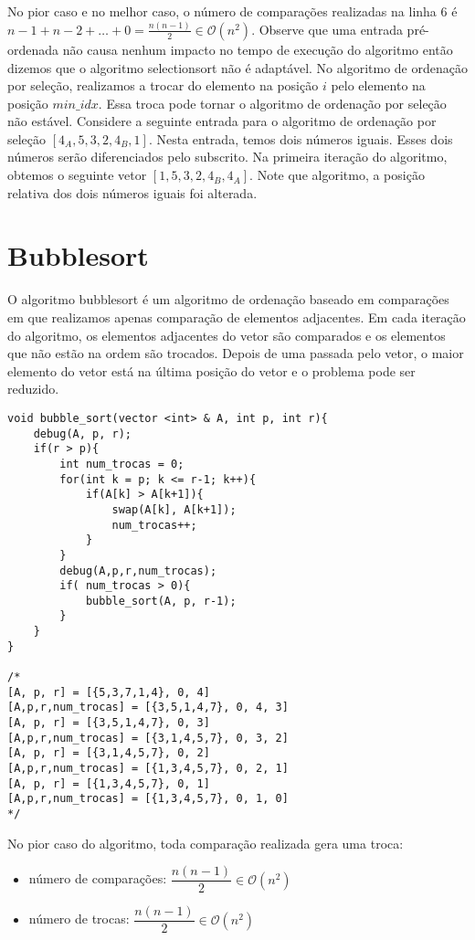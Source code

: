 No pior caso e no melhor caso, o número de comparações realizadas na linha 6 é $n-1 + n-2 + \ldots + 0 = \frac{n(n-1)}{2} \in \mathcal{O}(n^2)$. Observe que uma entrada pré-ordenada não causa nenhum impacto no tempo de execução do algoritmo então dizemos que o algoritmo selectionsort não é adaptável. No algoritmo de ordenação por seleção, realizamos a trocar do elemento na posição $i$ pelo elemento na posição $min\_idx$. Essa troca pode tornar o algoritmo de ordenação por seleção não estável. Considere a seguinte entrada para o algoritmo de ordenação por seleção $[4_A,5,3,2,4_B,1]$. Nesta entrada, temos dois números iguais. Esses dois números serão diferenciados pelo subscrito. Na primeira iteração do algoritmo, obtemos o seguinte vetor $[1,5,3,2,4_B,4_A]$. Note que algoritmo, a posição relativa dos dois números iguais foi alterada. 

\section{Bubblesort}

O algoritmo bubblesort é um algoritmo de ordenação baseado em comparações em que realizamos apenas comparação de elementos adjacentes. Em cada iteração do algoritmo, os elementos adjacentes do vetor são comparados e os elementos que não estão na ordem são trocados. Depois de uma passada pelo vetor, o maior elemento do vetor está na última posição do vetor e o problema pode ser reduzido.


\begin{verbatim}
void bubble_sort(vector <int> & A, int p, int r){
    debug(A, p, r);
    if(r > p){
        int num_trocas = 0;
        for(int k = p; k <= r-1; k++){
            if(A[k] > A[k+1]){
                swap(A[k], A[k+1]);
                num_trocas++;
            }
        }
        debug(A,p,r,num_trocas);
        if( num_trocas > 0){
            bubble_sort(A, p, r-1);
        } 
    }
}

/*
[A, p, r] = [{5,3,7,1,4}, 0, 4]
[A,p,r,num_trocas] = [{3,5,1,4,7}, 0, 4, 3]
[A, p, r] = [{3,5,1,4,7}, 0, 3]
[A,p,r,num_trocas] = [{3,1,4,5,7}, 0, 3, 2]
[A, p, r] = [{3,1,4,5,7}, 0, 2]
[A,p,r,num_trocas] = [{1,3,4,5,7}, 0, 2, 1]
[A, p, r] = [{1,3,4,5,7}, 0, 1]
[A,p,r,num_trocas] = [{1,3,4,5,7}, 0, 1, 0]
*/

\end{verbatim}

No pior caso do algoritmo, toda comparação realizada gera uma troca:

\begin{itemize}
    \item número de comparações: $\dfrac{n(n-1)}{2} \in \mathcal{O}(n^2)$
    \item número de trocas: $\dfrac{n(n-1)}{2} \in \mathcal{O}(n^2)$
\end{itemize}

